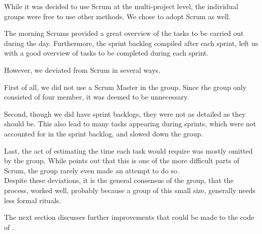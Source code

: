 While it was decided to use Scrum at the multi-project level, the individual groups were free to use other methods.
We chose to adopt Scrum as well.

The morning Scrums provided a great overview of the tasks to be carried out during the day.
Furthermore, the sprint backlog compiled after each sprint, left us with a good overview of tasks to be completed during each sprint.

However, we deviated from Scrum in several ways.

First of all, we did not use a Scrum Master in the group.
Since the group only consisted of four member, it was deemed to be unnecessary.

Second, though we did have sprint backlogs, they were not as detailed as they should be.
This also lead to many tasks appearing during sprints, which were not accounted for in the sprint backlog, and slowed down the group.

Last, the act of estimating the time each task would require was mostly omitted by the group.
While \citet{larmanAgile} points out that this is one of the more difficult parts of Scrum, the group rarely even made an attempt to do so.\\

Despite these deviations, it is the general consensus of the group, that the process, worked well, probably because a group of this small size, generally needs less formal rituals.


The next section discusses further improvements that could be made to the code of \launcher.
